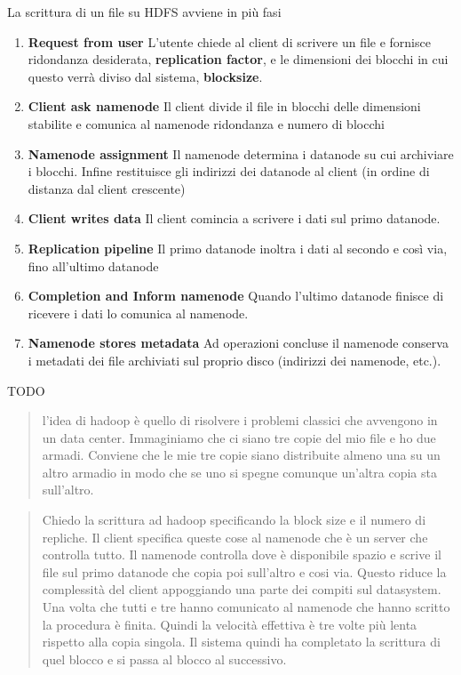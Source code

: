 \documentclass[italian,]{article}
\providecommand{\tightlist}{%
  \setlength{\itemsep}{0pt}\setlength{\parskip}{0pt}}
\begin{document}
La scrittura di un file su HDFS avviene in più fasi

\begin{enumerate}
\def\labelenumi{\arabic{enumi}.}
\tightlist
\item
  \textbf{Request from user} L'utente chiede al client di scrivere un
  file e fornisce ridondanza desiderata, \textbf{replication factor}, e
  le dimensioni dei blocchi in cui questo verrà diviso dal sistema,
  \textbf{blocksize}.
\item
  \textbf{Client ask namenode} Il client divide il file in blocchi delle
  dimensioni stabilite e comunica al namenode ridondanza e numero di
  blocchi
\item
  \textbf{Namenode assignment} Il namenode determina i datanode su cui
  archiviare i blocchi. Infine restituisce gli indirizzi dei datanode al
  client (in ordine di distanza dal client crescente)
\item
  \textbf{Client writes data} Il client comincia a scrivere i dati sul
  primo datanode.
\item
  \textbf{Replication pipeline} Il primo datanode inoltra i dati al
  secondo e così via, fino all'ultimo datanode
\item
  \textbf{Completion and Inform namenode} Quando l'ultimo datanode
  finisce di ricevere i dati lo comunica al namenode.
\item
  \textbf{Namenode stores metadata} Ad operazioni concluse il namenode
  conserva i metadati dei file archiviati sul proprio disco (indirizzi
  dei namenode, etc.).
\end{enumerate}

TODO

\begin{quote}
l'idea di hadoop è quello di risolvere i problemi classici che avvengono
in un data center. Immaginiamo che ci siano tre copie del mio file e ho
due armadi. Conviene che le mie tre copie siano distribuite almeno una
su un altro armadio in modo che se uno si spegne comunque un'altra copia
sta sull'altro.
\end{quote}

\begin{quote}
Chiedo la scrittura ad hadoop specificando la block size e il numero di
repliche. Il client specifica queste cose al namenode che è un server
che controlla tutto. Il namenode controlla dove è disponibile spazio e
scrive il file sul primo datanode che copia poi sull'altro e cosi via.
Questo riduce la complessità del client appoggiando una parte dei
compiti sul datasystem. Una volta che tutti e tre hanno comunicato al
namenode che hanno scritto la procedura è finita. Quindi la velocità
effettiva è tre volte più lenta rispetto alla copia singola. Il sistema
quindi ha completato la scrittura di quel blocco e si passa al blocco al
successivo.
\end{quote}
\end{document}
